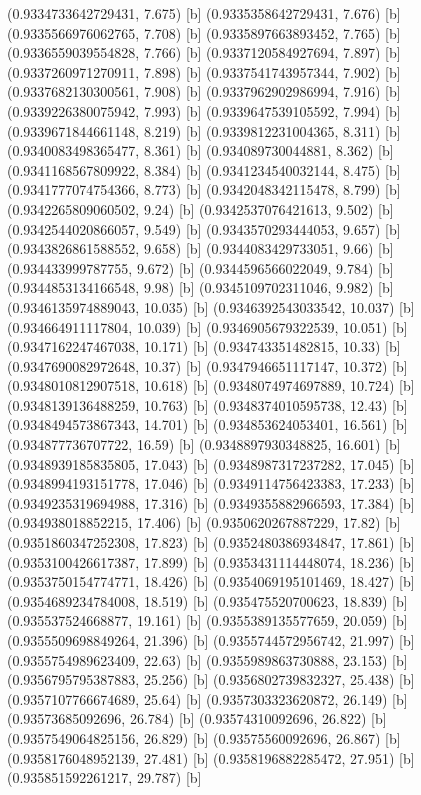 {{{(0.9334733642729431, 7.675) [b] 
(0.9335358642729431, 7.676) [b] 
(0.9335566976062765, 7.708) [b] 
(0.9335897663893452, 7.765) [b] 
(0.9336559039554828, 7.766) [b] 
(0.9337120584927694, 7.897) [b] 
(0.9337260971270911, 7.898) [b] 
(0.9337541743957344, 7.902) [b] 
(0.9337682130300561, 7.908) [b] 
(0.9337962902986994, 7.916) [b] 
(0.9339226380075942, 7.993) [b] 
(0.9339647539105592, 7.994) [b] 
(0.9339671844661148, 8.219) [b] 
(0.9339812231004365, 8.311) [b] 
(0.9340083498365477, 8.361) [b] 
(0.934089730044881, 8.362) [b] 
(0.9341168567809922, 8.384) [b] 
(0.9341234540032144, 8.475) [b] 
(0.9341777074754366, 8.773) [b] 
(0.9342048342115478, 8.799) [b] 
(0.9342265809060502, 9.24) [b] 
(0.9342537076421613, 9.502) [b] 
(0.9342544020866057, 9.549) [b] 
(0.9343570293444053, 9.657) [b] 
(0.9343826861588552, 9.658) [b] 
(0.9344083429733051, 9.66) [b] 
(0.934433999787755, 9.672) [b] 
(0.9344596566022049, 9.784) [b] 
(0.9344853134166548, 9.98) [b] 
(0.9345109702311046, 9.982) [b] 
(0.9346135974889043, 10.035) [b] 
(0.9346392543033542, 10.037) [b] 
(0.934664911117804, 10.039) [b] 
(0.9346905679322539, 10.051) [b] 
(0.9347162247467038, 10.171) [b] 
(0.934743351482815, 10.33) [b] 
(0.9347690082972648, 10.37) [b] 
(0.9347946651117147, 10.372) [b] 
(0.9348010812907518, 10.618) [b] 
(0.9348074974697889, 10.724) [b] 
(0.9348139136488259, 10.763) [b] 
(0.9348374010595738, 12.43) [b] 
(0.9348494573867343, 14.701) [b] 
(0.934853624053401, 16.561) [b] 
(0.934877736707722, 16.59) [b] 
(0.9348897930348825, 16.601) [b] 
(0.9348939185835805, 17.043) [b] 
(0.9348987317237282, 17.045) [b] 
(0.9348994193151778, 17.046) [b] 
(0.9349114756423383, 17.233) [b] 
(0.9349235319694988, 17.316) [b] 
(0.9349355882966593, 17.384) [b] 
(0.934938018852215, 17.406) [b] 
(0.9350620267887229, 17.82) [b] 
(0.9351860347252308, 17.823) [b] 
(0.9352480386934847, 17.861) [b] 
(0.9353100426617387, 17.899) [b] 
(0.9353431114448074, 18.236) [b] 
(0.9353750154774771, 18.426) [b] 
(0.9354069195101469, 18.427) [b] 
(0.9354689234784008, 18.519) [b] 
(0.935475520700623, 18.839) [b] 
(0.935537524668877, 19.161) [b] 
(0.9355389135577659, 20.059) [b] 
(0.9355509698849264, 21.396) [b] 
(0.9355744572956742, 21.997) [b] 
(0.9355754989623409, 22.63) [b] 
(0.9355989863730888, 23.153) [b] 
(0.9356795795387883, 25.256) [b] 
(0.9356802739832327, 25.438) [b] 
(0.9357107766674689, 25.64) [b] 
(0.9357303323620872, 26.149) [b] 
(0.93573685092696, 26.784) [b] 
(0.93574310092696, 26.822) [b] 
(0.9357549064825156, 26.829) [b] 
(0.93575560092696, 26.867) [b] 
(0.9358176048952139, 27.481) [b] 
(0.9358196882285472, 27.951) [b] 
(0.935851592261217, 29.787) [b] 
}}}
